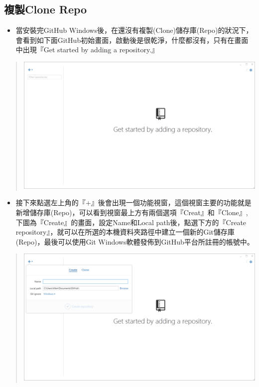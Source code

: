 \documentclass[letterpaper,10pt,english]{sphinxmanual}
\begin{document}
\subsection{複製Clone Repo}
\label{_doc/writing/index-github:clone-repo}\begin{itemize}
\item {} 
當安裝完GitHub Windows後，在還沒有複製(Clone)儲存庫(Repo)的狀況下，會看到如下面GitHub初始畫面，啟動後是很乾淨，什麼都沒有，只有在畫面中出現『Get started by adding a repository.』

\end{itemize}
\begin{quote}

\includegraphics{GitHub-Clone-001.png}
\end{quote}
\begin{itemize}
\item {} 
接下來點選左上角的『+』後會出現一個功能視窗，這個視窗主要的功能就是新增儲存庫(Repo)，可以看到視窗最上方有兩個選項『Creat』和『Clone』, 下圖為『Create』的畫面，設定Name和Local path後，點選下方的『Create repository』，就可以在所選的本機資料夾路徑中建立一個新的Git儲存庫(Repo)，最後可以使用Git Windows軟體發佈到GitHub平台所註冊的帳號中。

\end{itemize}
\begin{quote}

\includegraphics{GitHub-Clone-002.png}
\end{quote}
\end{document}
